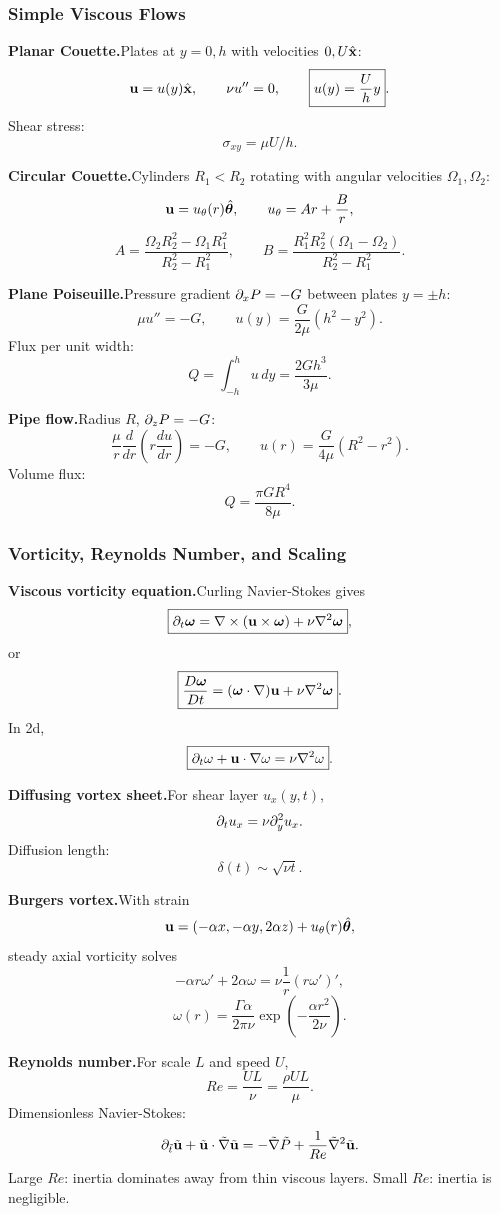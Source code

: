 \subsubsection*{Simple Viscous Flows}

\noindent\textbf{Planar Couette.}\quad Plates at $y=0,h$ with velocities $0,U\hat{\mathbf x}$:
\[
  \mathbf{u}=u(y)\hat{\mathbf x},\qquad
  \nu u''=0,\qquad
  \boxed{u(y)=\frac{U}{h}y}.
\]
Shear stress:
\[
  \sigma_{xy}=\mu U/h.
\]

\noindent\textbf{Circular Couette.}\quad Cylinders $R_1<R_2$ rotating with angular velocities $\Omega_1,\Omega_2$:
\[
  \mathbf{u}=u_\theta(r)\hat{\boldsymbol{\theta}},
  \qquad
  u_\theta=Ar+\frac{B}{r},
\]
\[
  A=\frac{\Omega_2R_2^2-\Omega_1R_1^2}{R_2^2-R_1^2},
  \qquad
  B=\frac{R_1^2R_2^2(\Omega_1-\Omega_2)}{R_2^2-R_1^2}.
\]

\noindent\textbf{Plane Poiseuille.}\quad Pressure gradient $\partial_xP=-G$ between plates $y=\pm h$:
\[
  \mu u''=-G,
  \qquad
  \boxed{u(y)=\frac{G}{2\mu}(h^2-y^2)}.
\]
Flux per unit width:
\[
  Q=\int_{-h}^{h}u\,dy=\frac{2Gh^3}{3\mu}.
\]

\noindent\textbf{Pipe flow.}\quad Radius $R$, $\partial_zP=-G$:
\[
  \frac{\mu}{r}\frac{d}{dr}\left(r\frac{du}{dr}\right)=-G,
  \qquad
  \boxed{u(r)=\frac{G}{4\mu}(R^2-r^2)}.
\]
Volume flux:
\[
  \boxed{Q=\frac{\pi G R^4}{8\mu}}.
\]

\subsubsection*{Vorticity, Reynolds Number, and Scaling}

\noindent\textbf{Viscous vorticity equation.}\quad Curling Navier-Stokes gives
\[
  \boxed{\partial_t\boldsymbol{\omega}=\nabla\times(\mathbf{u}\times\boldsymbol{\omega})+\nu\nabla^2\boldsymbol{\omega}},
\]
or
\[
  \boxed{\frac{D\boldsymbol{\omega}}{Dt}=(\boldsymbol{\omega}\cdot\nabla)\mathbf{u}+\nu\nabla^2\boldsymbol{\omega}}.
\]
In 2d,
\[
  \boxed{\partial_t\omega+\mathbf{u}\cdot\nabla\omega=\nu\nabla^2\omega}.
\]

\noindent\textbf{Diffusing vortex sheet.}\quad For shear layer $u_x(y,t)$,
\[
  \partial_tu_x=\nu\partial_y^2u_x.
\]
Diffusion length:
\[
  \delta(t)\sim\sqrt{\nu t}.
\]

\noindent\textbf{Burgers vortex.}\quad With strain
\[
  \mathbf{u}=(-\alpha x,-\alpha y,2\alpha z)+u_\theta(r)\hat{\boldsymbol{\theta}},
\]
steady axial vorticity solves
\[
  -\alpha r\omega'+2\alpha\omega=\nu\frac1r(r\omega')',
\]
\[
  \boxed{\omega(r)=\frac{\Gamma\alpha}{2\pi\nu}
  \exp\left(-\frac{\alpha r^2}{2\nu}\right)}.
\]

\noindent\textbf{Reynolds number.}\quad For scale $L$ and speed $U$,
\[
  \boxed{Re=\frac{UL}{\nu}=\frac{\rho UL}{\mu}}.
\]
Dimensionless Navier-Stokes:
\[
  \partial_{\tilde t}\tilde{\mathbf{u}}+\tilde{\mathbf{u}}\cdot\tilde\nabla\tilde{\mathbf{u}}
  =-\tilde\nabla\tilde P+\frac1{Re}\tilde\nabla^2\tilde{\mathbf{u}}.
\]
Large $Re$: inertia dominates away from thin viscous layers. Small $Re$: inertia is negligible.

